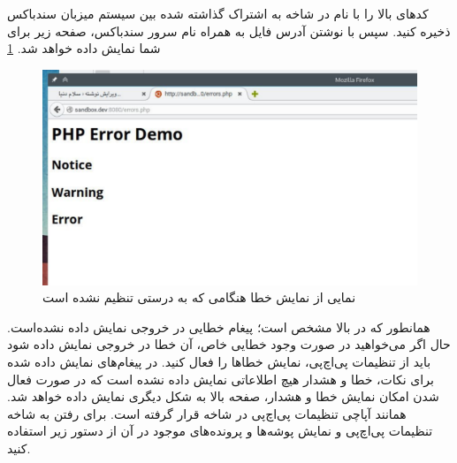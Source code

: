 کد‌های بالا را با نام 
 در شاخه به اشتراک گذاشته شده بین سیستم میزبان سند‌باکس ذخیره کنید. سپس با نوشتن آدرس فایل به همراه نام سرور سندباکس، صفحه زیر برای شما نمایش داده خواهد شد. \ref{UbuntuServer-PHP}
\newline
\begin{figure}
    \includegraphics[width=.9\textwidth ,height=.55\textwidth]{Pic/PHP1}
    \caption{ نمایی از  نمایش خطا هنگامی که به درستی تنظیم نشده است}
    \label{UbuntuServer-PHP}
\end{figure}

همانطور که در بالا مشخص است؛ پیغام خطایی در خروجی نمایش داده نشده‌است. حال اگر می‌خواهید در صورت وجود خطایی خاص، آن خطا در خروجی نمایش داده شود باید از تنظیمات پی‌اچ‌پی، نمایش خطاها را فعال کنید. در پیغام‌های نمایش داده شده برای نکات، خطا و هشدار هیچ اطلاعاتی نمایش داده نشده است که در صورت فعال شدن امکان نمایش خطا و هشدار، صفحه بالا به شکل دیگری نمایش داده خواهد شد.  همانند آپاچی تنظیمات پی‌اچ‌پی در شاخه 
قرار گرفته است. برای رفتن به شاخه تنظیمات پی‌اچ‌پی و نمایش پوشه‌ها و پرونده‌های موجود در آن از دستور زیر استفاده کنید.
\newline
\begin{latin}  
    
\end{latin}

